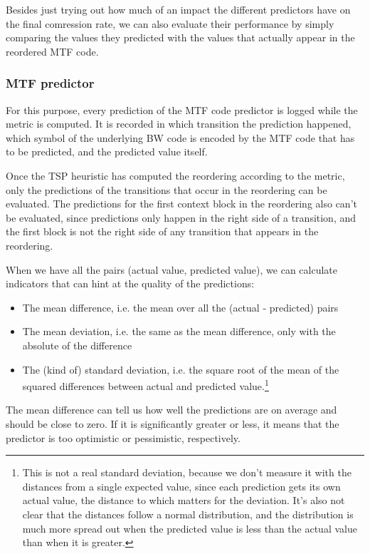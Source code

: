 \documentclass[a4paper]{scrreprt}
\begin{document}
Besides just trying out how much of an impact the different predictors have on
the final comression rate, we can also evaluate their performance by simply
comparing the values they predicted with the values that actually appear in the
reordered MTF code.

\subsubsection{MTF predictor}

For this purpose, every prediction of the MTF code predictor is logged while the
metric is computed. It is recorded in which transition the prediction happened,
which symbol of the underlying BW code is encoded by the MTF code that has to be
predicted, and the predicted value itself.

Once the TSP heuristic has computed the reordering according to the metric,
only the predictions of the transitions that occur in the reordering can be
evaluated. The predictions for the first context block in the reordering also
can't be evaluated, since predictions only happen in the right side of a
transition, and the first block is not the right side of any transition that
appears in the reordering.


When we have all the pairs (actual value, predicted value), we can calculate
indicators that can hint at the quality of the predictions:
\begin{itemize}
  \item The mean difference, i.e. the mean over all the (actual - predicted)
  pairs
  \item The mean deviation, i.e. the same as the mean difference, only with the
  absolute of the difference
  \item The (kind of) standard deviation, i.e. the square root of the mean of
  the squared differences between actual and predicted value.\footnote{This is
  not a real standard deviation, because we don't measure it with the distances
  from a single expected value, since each prediction gets its own actual
  value, the distance to which matters for the deviation. It's also not clear
  that the distances follow a normal distribution, and the distribution is much
  more spread out when the predicted value is less than the actual value than
  when it is greater.}
\end{itemize}

The mean difference can tell us how well the predictions are on average and
should be close to zero. If it is significantly greater or less, it means that
the predictor is too optimistic or pessimistic, respectively.
\end{document}
